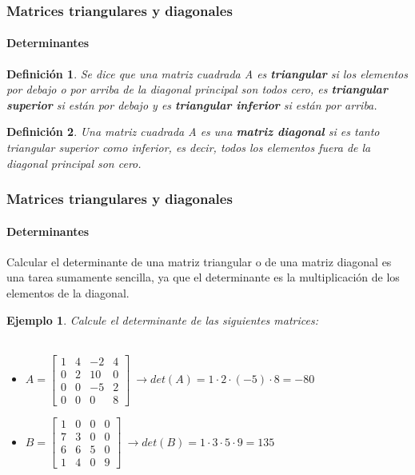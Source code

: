 \documentclass[11pt]{beamer}
\newtheorem{defi}{Definición}
\newtheorem{ejem}{Ejemplo}
\begin{document}
\begin{frame}
\frametitle{Matrices triangulares y diagonales}
\framesubtitle{Determinantes}
\begin{defi}
Se dice que una matriz cuadrada A es \textbf{triangular} si los elementos por debajo o por arriba de la diagonal principal son todos cero, es \textbf{triangular superior} si están por debajo y es \textbf{triangular inferior} si están por arriba.
\end{defi}
\begin{defi}
Una matriz cuadrada A es una \textbf{matriz diagonal} si es tanto triangular superior como inferior, es decir, todos los elementos fuera de la diagonal principal son cero.
\end{defi}
\end{frame}

\begin{frame}
\frametitle{Matrices triangulares y diagonales}
\framesubtitle{Determinantes}
Calcular el determinante de una matriz triangular o de una matriz diagonal es una tarea sumamente sencilla, ya que el determinante es la multiplicación de los elementos de la diagonal.
\begin{ejem}
Calcule el determinante de las siguientes matrices: \\ \hspace{0cm} \\
\begin{itemize}
\item ${\displaystyle A = {\begin{bmatrix}1&4&-2&4\\0&2&10&0\\0&0&-5&2\\0&0&0&8\end{bmatrix}}} ~ \rightarrow 
det(A) = 1 \cdot 2 \cdot (-5) \cdot 8 = -80$
\item ${\displaystyle B = {\begin{bmatrix}1&0&0&0\\7&3&0&0\\6&6&5&0\\1&4&0&9\end{bmatrix}}} ~ \rightarrow 
det(B) = 1 \cdot 3 \cdot 5 \cdot 9 = 135$
\end{itemize}
\end{ejem}
\end{frame}
\end{document}

